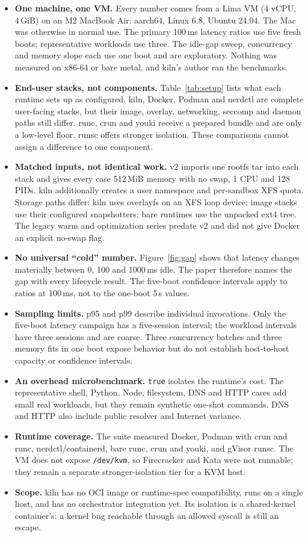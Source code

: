 \documentclass[10pt,letterpaper]{article}
\newcommand{\code}[1]{\texttt{#1}}
\begin{document}
\begin{itemize}
\item \textbf{One machine, one VM.} Every number comes from a Lima VM (4 vCPU,
4\,GiB) on an M2 MacBook Air: aarch64, Linux 6.8, Ubuntu 24.04. The Mac was
otherwise in normal use. The primary 100\,ms latency ratios use five fresh boots;
representative workloads use three. The idle-gap sweep, concurrency and memory
slope each use one boot and are exploratory. Nothing was measured on x86-64 or
bare metal, and kiln's author ran the benchmarks.
\item \textbf{End-user stacks, not components.} Table~\ref{tab:setup} lists
what each runtime sets up as configured. kiln, Docker, Podman and nerdctl are
complete user-facing stacks, but their image, overlay, networking, seccomp and
daemon paths still differ. runc, crun and youki receive a prepared bundle and
are only a low-level floor. runsc offers stronger isolation. These comparisons
cannot assign a difference to one component.
\item \textbf{Matched inputs, not identical work.} v2 imports one rootfs tar into
each stack and gives every case 512\,MiB memory with no swap, 1 CPU and 128 PIDs.
kiln additionally creates a user namespace and per-sandbox XFS quota. Storage
paths differ: kiln uses overlayfs on an XFS loop device; image stacks use their
configured snapshotters; bare runtimes use the unpacked ext4 tree. The legacy
warm and optimization series predate v2 and did not give Docker an explicit
no-swap flag.
\item \textbf{No universal ``cold'' number.} Figure~\ref{fig:gap} shows that
latency changes materially between 0, 100 and 1000\,ms idle. The paper therefore
names the gap with every lifecycle result. The five-boot confidence intervals
apply to ratios at 100\,ms, not to the one-boot 5\,s values.
\item \textbf{Sampling limits.} p95 and p99 describe individual invocations.
Only the five-boot latency campaign has a five-session interval; the workload
intervals have three sessions and are coarse. Three concurrency batches and
three memory fits in one boot expose behavior but do not establish host-to-host
capacity or confidence intervals.
\item \textbf{An overhead microbenchmark.} \code{true} isolates the runtime's
cost. The representative shell, Python, Node, filesystem, DNS and HTTP cases add
small real workloads, but they remain synthetic one-shot commands. DNS and HTTP
also include public resolver and Internet variance.
\item \textbf{Runtime coverage.} The suite measured Docker, Podman with crun and
runc, nerdctl/containerd, bare runc, crun and youki, and gVisor runsc. The VM
does not expose \code{/dev/kvm}, so Firecracker and Kata were not runnable; they
remain a separate stronger-isolation tier for a KVM host.
\item \textbf{Scope.} kiln has no OCI image or runtime-spec compatibility, runs
on a single host, and has no orchestrator integration yet. Its isolation is a
shared-kernel container's: a kernel bug reachable through an allowed syscall is
still an escape.
\end{itemize}
\end{document}
